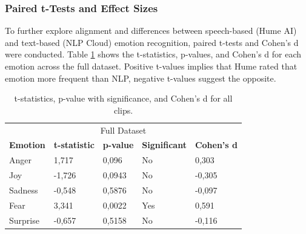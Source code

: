 \subsubsection{Paired t-Tests and Effect Sizes}
To further explore alignment and differences between speech-based (Hume AI) and text-based (NLP Cloud) emotion recognition, paired t-tests and Cohen's d were conducted. 
Table \ref{tab:t-test-all} shows the t-statistics, p-values, and Cohen's d for each emotion across the full dataset. Positive t-values implies that Hume rated that emotion more frequent than NLP, negative t-values suggest the opposite.
\begin{table}[!h]
    \centering
    \begin{tabular}{lllll}
    \multicolumn{5}{c}{\cellcolor[HTML]{C0C0C0}Full Dataset}                                                                                                                                                    \\
    \multicolumn{1}{c|}{\textbf{Emotion}} & \multicolumn{1}{c}{\textbf{t-statistic}} & \multicolumn{1}{c}{\textbf{p-value}} & \multicolumn{1}{c}{\textbf{Significant}} & \multicolumn{1}{c}{\textbf{Cohen's d}} \\ \hline
    \multicolumn{1}{l|}{Anger}            & 1,717                                    & 0,096                                & No                                       & 0,303                                  \\
    \multicolumn{1}{l|}{Joy}              & -1,726                                   & 0,0943                               & No                                       & -0,305                                 \\
    \multicolumn{1}{l|}{Sadness}          & -0,548                                   & 0,5876                               & No                                       & -0,097                                 \\
    \multicolumn{1}{l|}{Fear}             & 3,341                                    & 0,0022                               & Yes                                      & 0,591                                  \\
    \multicolumn{1}{l|}{Surprise}         & -0,657                                   & 0,5158                               & No                                       & -0,116                                
    \end{tabular}
    \caption{t-statistics, p-value with significance, and Cohen's d for all clips.}
    \label{tab:t-test-all}
\end{table}

